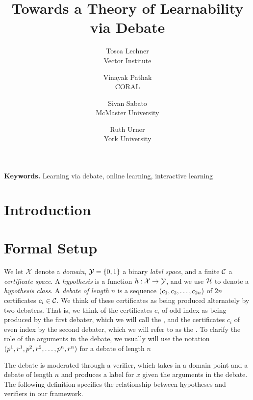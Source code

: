 \documentclass[11pt,letterpaper]{article}
\title{Towards a Theory of Learnability via Debate}
\author{
  Tosca Lechner\\
  {\small Vector Institute}
  \and
  Vinayak Pathak\\
  {\small CORAL}
  \and
  Sivan Sabato\\
  {\small McMaster University}
  \and
  Ruth Urner\\
  {\small York University}
}
\date{}
\theoremstyle{definition}
\theoremstyle{plain}
\begin{document}
\maketitle

\begin{abstract}%
\end{abstract}

\noindent\textbf{Keywords.} Learning via debate, online learning, interactive learning

\section{Introduction}



% 

\section{Formal Setup}\label{sec:formal}
We let ${\mathcal X}$ denote a \emph{domain}, ${\mathcal Y} = \{0,1\}$ a binary \emph{label space}, and a finite ${{\mathcal C}}$ a \emph{certificate space}.  
A \emph{hypothesis} is a function $h:{\mathcal X}\to{\mathcal Y}$, and we use ${{\mathcal H}}$ to denote a \emph{hypothesis class}.
A \emph{debate of length} $n$ is a sequence $(c_1, c_2, \ldots, c_{2n})$ of $2n$ certificates $c_i\in{{\mathcal C}}$. We think of these certificates as being produced alternately by two debaters. That is, we think of the certificates $c_i$ of odd index as being produced by the first debater, which we will call the \dt, and the certificates $c_i$ of even index by the second debater, which we will refer to as the \df. To clarify the role of the arguments in the debate, we usually will use the notation $({p}^1, {r}^1, {p}^2, {r}^2, \ldots,  {p}^n, {r}^n)$ for a debate of length $n$

The debate is moderated through a verifier, which takes in a domain point and a debate of length $n$ and produces a label for $x$ given the arguments in the debate. 
The following definition specifies the relationship between hypotheses and verifiers in our framework.
\end{document}
